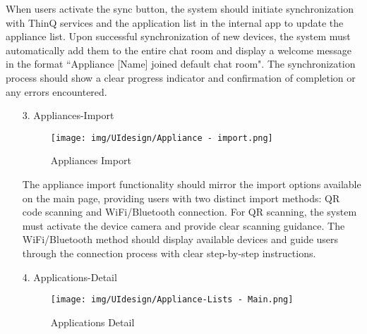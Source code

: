 \documentclass[conference]{IEEEtran}
\begin{document}
\begin{enumerate}
\begin{itemize}
\begin{itemize}
\begin{enumerate}
\begin{enumerate}
    When users activate the sync button, the system should initiate synchronization with ThinQ services and the application list in the internal app to update the appliance list. Upon successful synchronization of new devices, the system must automatically add them to the entire chat room and display a welcome message in the format ``Appliance [Name] joined default chat room". The synchronization process should show a clear progress indicator and confirmation of completion or any errors encountered. \\
\end{enumerate}

\begin{enumerate}
    \item[3.] Appliances-Import
    \begin{figure}[h]
        {\centering
        \hspace{4cm}
        \begin{minipage}{0.2\columnwidth}
            \texttt{[image: img/UIdesign/Appliance - import.png]}
            \captionsetup{width=2.5\linewidth}
        \caption{Appliances Import} %
        \end{minipage}}
    \end{figure}

    The appliance import functionality should mirror the import options available on the main page, providing users with two distinct import methods: QR code scanning and WiFi/Bluetooth connection. For QR scanning, the system must activate the device camera and provide clear scanning guidance. The WiFi/Bluetooth method should display available devices and guide users through the connection process with clear step-by-step instructions. \\ 
\end{enumerate}

\begin{enumerate}
    \item[4.] Applications-Detail
    \begin{figure}[h]
        {\centering
        \hspace{4cm}
        \begin{minipage}{0.4\columnwidth}
            \texttt{[image: img/UIdesign/Appliance-Lists - Main.png]}
            \caption{Applications Detail}
        \end{minipage}}
    \end{figure}


\end{enumerate}
\end{enumerate}
\end{itemize}
\end{itemize}
\end{enumerate}
\end{document}
